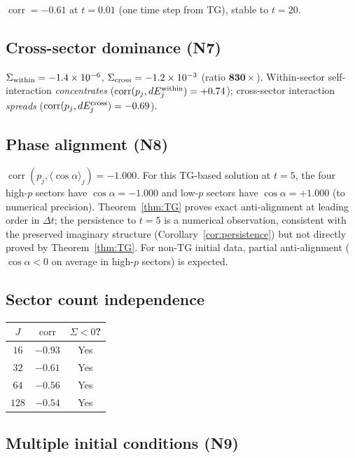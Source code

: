 \documentclass[11pt]{article}
\theoremstyle{definition}
\DeclareMathOperator{\corr}{corr}
\begin{document}
$\corr = -0.61$ at $t = 0.01$ (one time step from TG),
stable to $t = 20$.

\subsection{Cross-sector dominance (N7)}

$\Sigma_{\rm within} = -1.4\times 10^{-6}$,
$\Sigma_{\rm cross} = -1.2\times 10^{-3}$
(ratio $\mathbf{830\times}$).  Within-sector self-interaction
\emph{concentrates} ($\corr(p_j, dE^{\rm within}_j)=+0.74$);
cross-sector interaction \emph{spreads}
($\corr(p_j, dE^{\rm cross}_j) = -0.69$).

\subsection{Phase alignment (N8)}

$\corr(p_j,\langle\cos\alpha\rangle_j) = -1.000$.
For this TG-based solution at $t=5$, the four high-$p$
sectors have $\cos\alpha = -1.000$ and low-$p$ sectors
have $\cos\alpha = +1.000$ (to numerical precision).
Theorem~\ref{thm:TG} proves exact anti-alignment at
leading order in $\Delta t$; the persistence to $t=5$
is a numerical observation, consistent with the preserved
imaginary structure (Corollary~\ref{cor:persistence})
but not directly proved by Theorem~\ref{thm:TG}.
For non-TG initial data, partial anti-alignment
($\cos\alpha<0$ on average in high-$p$ sectors)
is expected.

\subsection{Sector count independence}

\begin{center}
\begin{tabular}{@{}ccc@{}}
\toprule
$J$ & $\corr$ & $\Sigma<0$? \\
\midrule
$16$  & $-0.93$ & Yes \\
$32$  & $-0.61$ & Yes \\
$64$  & $-0.56$ & Yes \\
$128$ & $-0.54$ & Yes \\
\bottomrule
\end{tabular}
\end{center}

\subsection{Multiple initial conditions (N9)}
\label{sec:multi-ic}
\end{document}
